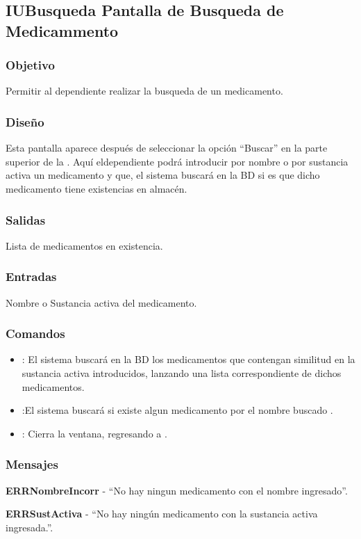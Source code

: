 \subsection{IUBusqueda Pantalla de Busqueda de Medicammento}

\subsubsection{Objetivo}
	Permitir al dependiente realizar la busqueda de un medicamento.

\subsubsection{Diseño}
	Esta pantalla aparece despu\'es de seleccionar la opci\'on "`Buscar"' en la parte superior de la \label{IUCompra}. Aqu\'i eldependiente podr\'a introducir por nombre o por sustancia activa un medicamento y que, el sistema buscar\'a en la BD si es que dicho medicamento tiene existencias en almac\'en.


\subsubsection{Salidas}

	Lista de medicamentos en existencia.

\subsubsection{Entradas}
Nombre o Sustancia activa del medicamento.

\subsubsection{Comandos}
\begin{itemize}
		\item {}: El sistema buscar\'a en la BD los medicamentos que contengan similitud en la sustancia activa introducidos, lanzando una lista correspondiente de dichos medicamentos.
		\item {}:El sistema buscar\'a si existe algun medicamento por el nombre buscado .
		\item {}: Cierra la ventana, regresando a  \label{IUCompra}.
\end{itemize}

\subsubsection{Mensajes}
	\begin{Citemize}
		\item {\bf ERRNombreIncorr} - "`No hay ningun medicamento con el nombre ingresado"'.
		\item {\bf ERRSustActiva} - "`No hay ning\'un medicamento con la sustancia activa ingresada."'.
	\end{Citemize}